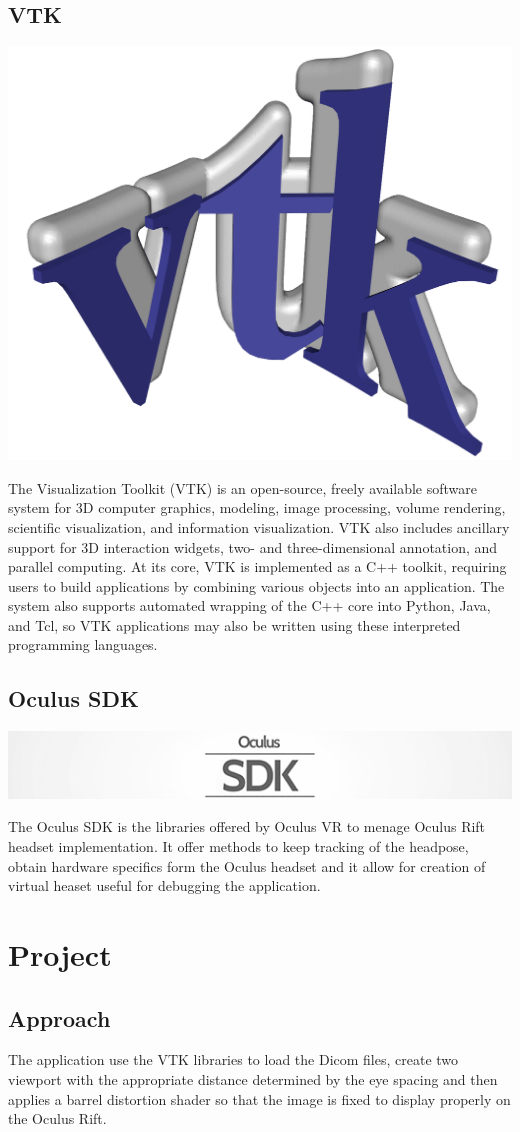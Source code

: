 \documentclass[11pt]{article} %
\begin{document}
\subsection{VTK}
\includegraphics[width=0.2\linewidth]{VTK.png}

The Visualization Toolkit (VTK) is an open-source, freely available software system for 3D computer graphics, modeling, image processing, volume rendering, scientific visualization, and information visualization. VTK also includes ancillary support for 3D interaction widgets, two- and three-dimensional annotation, and parallel computing. At its core, VTK is implemented as a C++ toolkit, requiring users to build applications by combining various objects into an application. The system also supports automated wrapping of the C++ core into Python, Java, and Tcl, so VTK applications may also be written using these interpreted programming languages.

\subsection{Oculus SDK}
\includegraphics[width=0.4\linewidth,clip,trim=7cm -3mm 5cm -2mm]{Oculus_sdk.png}

The Oculus SDK is the libraries offered by Oculus VR to menage Oculus Rift headset implementation. It offer methods to keep tracking of the headpose, obtain hardware specifics form the Oculus headset and it allow for creation of virtual heaset useful for debugging the application.













\newpage
\section{Project}

\subsection{Approach}
The application use the VTK libraries to load the Dicom files, create two viewport with the appropriate distance determined by the eye spacing and then applies a barrel distortion shader so that the image is fixed to display properly on the Oculus Rift.
\end{document}
